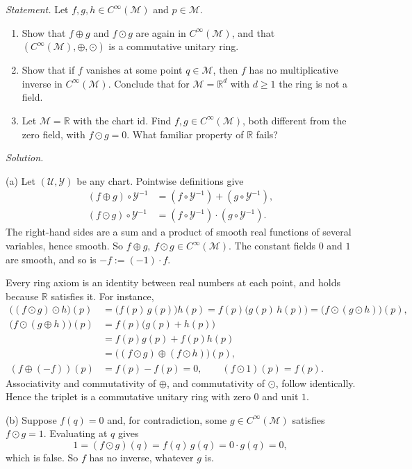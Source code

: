 \documentclass[11pt]{article}
\newcommand{\Cinf}{C^\infty(\mathcal M)}
\begin{document}
\noindent\textit{Statement.} Let $f,g,h\in\Cinf$ and $p\in\mathcal M$.
\begin{enumerate}[label=(\alph*)]
  \item Show that $f\oplus g$ and $f\odot g$ are again in $\Cinf$, and that
  $(\Cinf,\oplus,\odot)$ is a commutative unitary ring.
  \item Show that if $f$ vanishes at some point $q\in\mathcal M$, then $f$
  has no multiplicative inverse in $\Cinf$. Conclude that for $\mathcal
  M=\mathbb R^d$ with $d\ge1$ the ring is not a field.
  \item Let $\mathcal M=\mathbb R$ with the chart $\mathrm{id}$. Find
  $f,g\in\Cinf$, both different from the zero field, with $f\odot g=0$.
  What familiar property of $\mathbb R$ fails?
\end{enumerate}

\medskip
\noindent\textit{Solution.}

(a) Let $(\mathcal U,\mathcal Y)$ be any chart. Pointwise definitions give
\begin{align*}
(f\oplus g)\circ\mathcal Y^{-1} &= (f\circ\mathcal Y^{-1})+(g\circ\mathcal Y^{-1}),\\
(f\odot g)\circ\mathcal Y^{-1} &= (f\circ\mathcal Y^{-1})\cdot(g\circ\mathcal Y^{-1}).
\end{align*}
The right-hand sides are a sum and a product of smooth real functions of
several variables, hence smooth. So $f\oplus g,\ f\odot g\in\Cinf$. The
constant fields $0$ and $1$ are smooth, and so is $-f:=(-1)\cdot f$.

Every ring axiom is an identity between real numbers at each point, and
holds because $\mathbb R$ satisfies it. For instance,
\begin{align*}
\big((f\odot g)\odot h\big)(p) &= \big(f(p)\,g(p)\big)h(p) = f(p)\big(g(p)\,h(p)\big) = \big(f\odot(g\odot h)\big)(p),\\
\big(f\odot(g\oplus h)\big)(p) &= f(p)\big(g(p)+h(p)\big)\\
&= f(p)g(p)+f(p)h(p)\\
&= \big((f\odot g)\oplus(f\odot h)\big)(p),\\
(f\oplus(-f))(p) &= f(p)-f(p)=0,\qquad (f\odot1)(p)=f(p).
\end{align*}
Associativity and commutativity of $\oplus$, and commutativity of $\odot$,
follow identically. Hence the triplet is a commutative unitary ring with
zero $0$ and unit $1$.

(b) Suppose $f(q)=0$ and, for contradiction, some $g\in\Cinf$ satisfies
$f\odot g=1$. Evaluating at $q$ gives
\[
1=(f\odot g)(q)=f(q)\,g(q)=0\cdot g(q)=0,
\]
which is false. So $f$ has no inverse, whatever $g$ is.
\end{document}
